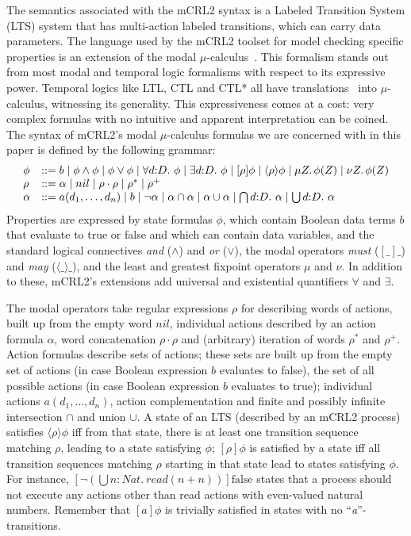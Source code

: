 \documentclass[letter]{llncs}
\begin{document}
The semantics associated with the mCRL2 syntax is a Labeled Transition System (LTS)
system that has multi-action labeled transitions, which can carry data parameters. The language used by the mCRL2
toolset for model checking specific properties is an extension of the modal
$\mu$-calculus~\cite{Emerson97modelchecking}. This formalism stands out from most modal and temporal logic formalisms with respect to its
expressive power. Temporal logics like LTL, CTL and CTL* all have translations~\cite{cranen2010linear,cranen2011linear} into $\mu$-calculus,
witnessing its generality. This expressiveness comes at a cost: very complex formulas with no intuitive and apparent interpretation can be coined. 
The syntax of mCRL2's modal $\mu$-calculus formulas we are concerned with in this paper
is defined by the following grammar:
\vspace{-5 pt}
\[
\begin{array}{ll}
\phi & ::= b \mid \phi\wedge\phi \mid \phi\vee\phi \mid \forall d{:}D.~\phi \mid \exists d{:}D.~\phi
\mid [\rho]\phi \mid \langle\rho\rangle\phi \mid \mu Z\ldotp\phi(Z) \mid \nu Z\ldotp\phi(Z) \\
\rho & ::= \alpha \mid nil \mid \rho\cdot\rho \mid \rho^* \mid \rho^+ \\
\alpha & ::= a(d_1,\dots,d_n) \mid b \mid \neg \alpha \mid \alpha\cap\alpha \mid 
\alpha\cup\alpha \mid \bigcap{d{:}D}.~\alpha \mid \bigcup{d{:}D}.~\alpha \\
\end{array}
\]
Properties are expressed by state formulas $\phi$, which contain
Boolean data terms $b$ that evaluate to true or false and which can contain data variables, and the
standard logical connectives \emph{and} ($\land$) and \emph{or}
($\lor$), the modal operators \emph{must} ($[\_]\_$) and \emph{may}
($\langle \_\rangle\_$), and the least and greatest fixpoint operators
$\mu$ and $\nu$. In addition to these, mCRL2's extensions add universal
and existential quantifiers $\forall$ and $\exists$.

The modal operators take regular expressions
$\rho$ for describing words of actions, built up from the empty word $nil$, individual
actions described by an action formula $\alpha$, word
concatenation $\rho \cdot \rho$ and (arbitrary) iteration of words $\rho^*$ and $\rho^+$.
Action formulas describe sets of actions; these sets are built up from the empty
set of actions (in case Boolean expression $b$ evaluates to false), the set of all possible actions
(in case Boolean expression $b$ evaluates to true); individual actions $a(d_1,\dots,d_n)$, 
action complementation and finite and possibly infinite intersection $\cap$ and union $\cup$.
A state of an LTS (described by an mCRL2 process) satisfies $\langle \rho \rangle \phi$
iff from that state, there is at least one transition sequence matching $\rho$,
leading to a state satisfying $\phi$;
$[\rho]\phi$ is satisfied by a state iff all transition sequences matching $\rho$ starting in that 
state lead to states satisfying $\phi$.
For instance, $[\neg (\bigcup{n{:}Nat}.~
\textit{read}(n+n))]\text{false}$ states that a process should not execute any actions
other than read actions with even-valued natural numbers.
Remember that $[a]\phi$ is trivially satisfied in states with no ``\emph{a}''-transitions.
\end{document}
